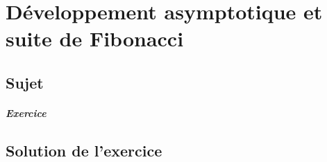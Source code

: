 \chapter{Développement asymptotique et suite de Fibonacci}

\section{Sujet}

\paragraph{Exercice}

\section{Solution de l'exercice}

